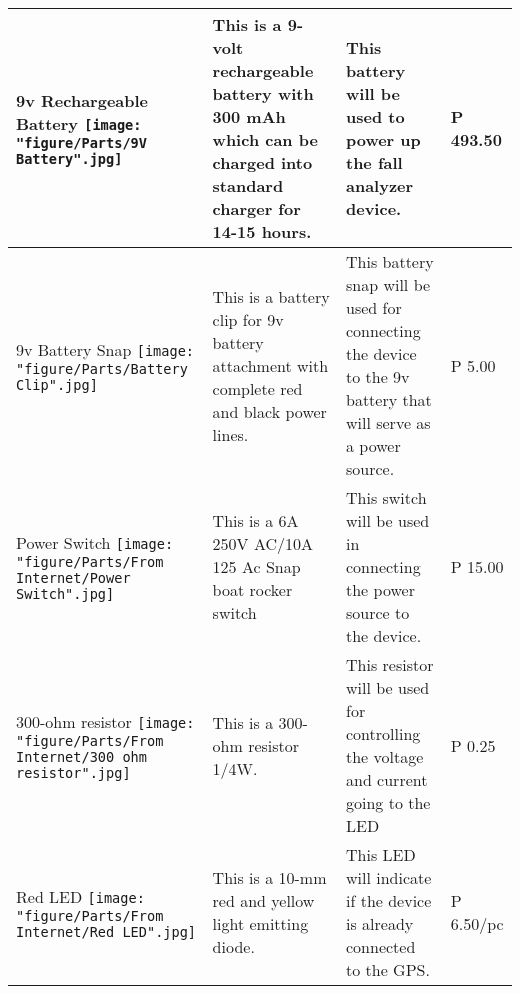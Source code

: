 \begin{center}
{\begin{tabularx}{\textwidth}{p{}|p{}|p{}|p{}}
\hline

\begin{center}
9v Rechargeable Battery
\texttt{[image: "figure/Parts/9V Battery".jpg]} 
\end{center}
& This is a 9-volt rechargeable battery with 300 mAh which can be charged into standard charger for 14-15 hours.
& This battery will be used to power up the fall analyzer device.
& P 493.50\\

\hline

\begin{center}
9v Battery Snap
\texttt{[image: "figure/Parts/Battery Clip".jpg]} 
\end{center}
& This is a battery clip for 9v battery attachment with complete red and black power lines. \cite{eGi182} %
& This battery snap will be used for connecting the device to the 9v battery that will serve as a power source. 
& P 5.00 \\

\hline

\begin{center}
Power Switch
\texttt{[image: "figure/Parts/From Internet/Power Switch".jpg]} 
\end{center}
& This is a 6A 250V AC/10A 125 Ac Snap boat rocker switch \cite{eGi183} %
& This switch will be used in connecting the power source to the device.
& P 15.00 \\

\hline

\begin{center}
300-ohm resistor
\texttt{[image: "figure/Parts/From Internet/300 ohm resistor".jpg]} 
\end{center}
& This is a 300-ohm resistor 1/4W. \cite{eGi185} %
& This resistor will be used for controlling the voltage and current going to the LED
& P 0.25 \\

\hline

\begin{center}
Red LED
\texttt{[image: "figure/Parts/From Internet/Red LED".jpg]} 
\end{center}
& This is a 10-mm red and yellow light emitting diode. \cite{eGi184} %
& This LED will indicate if the device is already connected to the GPS.
& P 6.50/pc \\


\end{tabularx}}
\end{center}
